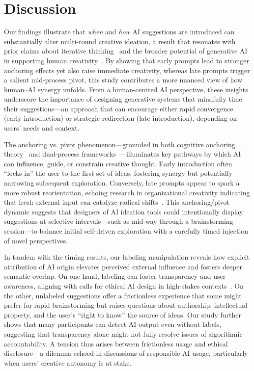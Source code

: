 \documentclass{article}
\begin{document}
\section{Discussion}

Our findings illustrate that \textit{when} and \textit{how} AI suggestions are introduced can substantially alter multi-round creative ideation, a result that resonates with prior claims about iterative thinking~\cite{tolkamp2023creativity,zamani2022closer} and the broader potential of generative AI in supporting human creativity~\cite{epstein2023art,kwon2024designer,reeves2024generative}. By showing that early prompts lead to stronger anchoring effects yet also raise immediate creativity, whereas late prompts trigger a salient mid-process pivot, this study contributes a more nuanced view of how human–AI synergy unfolds. From a human-centred AI perspective, these insights underscore the importance of designing generative systems that mindfully time their suggestions—an approach that can encourage either rapid convergence (early introduction) or strategic redirection (late introduction), depending on users’ needs and context.

The anchoring vs. pivot phenomenon—grounded in both cognitive anchoring theory~\cite{tversky1974judgment} and dual-process frameworks~\cite{kahneman2011thinking}—illuminates key pathways by which AI can influence, guide, or constrain creative thought. Early introduction often “locks in” the user to the first set of ideas, fostering synergy but potentially narrowing subsequent exploration. Conversely, late prompts appear to spark a more robust reorientation, echoing research in organizational creativity indicating that fresh external input can catalyze radical shifts~\cite{harvey2014creative}. This anchoring/pivot dynamic suggests that designers of AI ideation tools could intentionally display suggestions at selective intervals—such as mid-way through a brainstorming session—to balance initial self-driven exploration with a carefully timed injection of novel perspectives.

In tandem with the timing results, our labeling manipulation reveals how explicit attribution of AI origin elevates perceived external influence and fosters deeper semantic overlap. On one hand, labeling can foster transparency and user awareness, aligning with calls for ethical AI design in high-stakes contexts~\cite{bankins2024multilevel,dietvorst2015algorithm}. On the other, unlabeled suggestions offer a frictionless experience that some might prefer for rapid brainstorming but raises questions about authorship, intellectual property, and the user’s “right to know” the source of ideas. Our study further shows that many participants can detect AI output even without labels, suggesting that transparency alone might not fully resolve issues of algorithmic accountability. A tension thus arises between frictionless usage and ethical disclosure—a dilemma echoed in discussions of responsible AI usage, particularly when users’ creative autonomy is at stake.
\end{document}
